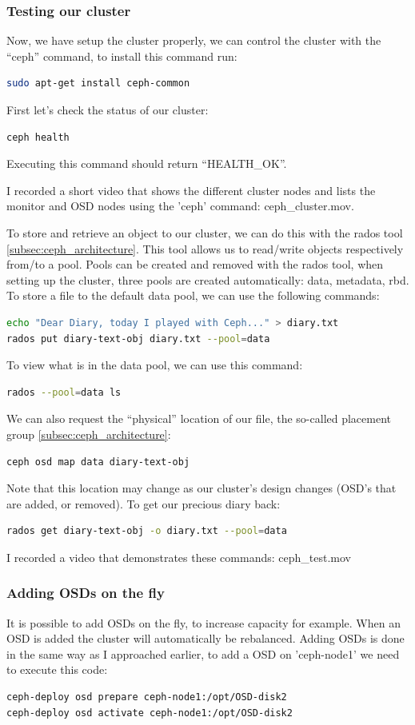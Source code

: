 \documentclass[12pt]{report}
\begin{document}
\subsubsection{Testing our cluster}
Now, we have setup the cluster properly, we can control the cluster
with the ``ceph'' command, to install this command run: 
\begin{lstlisting}[language=bash]
sudo apt-get install ceph-common
\end{lstlisting}
First let's check the status of our cluster:
\begin{lstlisting}[language=bash]
ceph health
\end{lstlisting}
Executing this command should return ``HEALTH\_OK''.

I recorded a short video that shows the different cluster nodes and
lists the monitor and OSD nodes using the 'ceph' command: ceph\_cluster.mov.

To store and retrieve an object to our cluster, we can do this with
the rados tool \ref{subsec:ceph_architecture}. This tool allows us to
read/write objects respectively from/to a pool.
Pools can be created and removed with the rados tool, when setting up
the cluster, three pools are created automatically: data, metadata,
rbd.
To store a file to the default data pool, we can use the following
commands:
\begin{lstlisting}[language=bash]
echo "Dear Diary, today I played with Ceph..." > diary.txt
rados put diary-text-obj diary.txt --pool=data
\end{lstlisting}
To view what is in the data pool, we can use this command:
\begin{lstlisting}[language=bash]
rados --pool=data ls
\end{lstlisting}
We can also request the ``physical'' location of our file, the
so-called placement group \ref{subsec:ceph_architecture}:
\begin{lstlisting}[language=bash]
ceph osd map data diary-text-obj
\end{lstlisting}
Note that this location may change as our cluster's design changes
(OSD's that are added, or removed).
To get our precious diary back:
\begin{lstlisting}[language=bash]
rados get diary-text-obj -o diary.txt --pool=data
\end{lstlisting}
I recorded a video that demonstrates these commands: ceph\_test.mov

\subsubsection{Adding OSDs on the fly}
It is possible to add OSDs on the fly, to increase capacity for
example. When an OSD is added the cluster will automatically be
rebalanced.
Adding OSDs is done in the same way as I approached earlier,
to add a OSD on 'ceph-node1' we need to execute this code:
\begin{lstlisting}[language=bash]
ceph-deploy osd prepare ceph-node1:/opt/OSD-disk2
ceph-deploy osd activate ceph-node1:/opt/OSD-disk2
\end{lstlisting}
\end{document}
